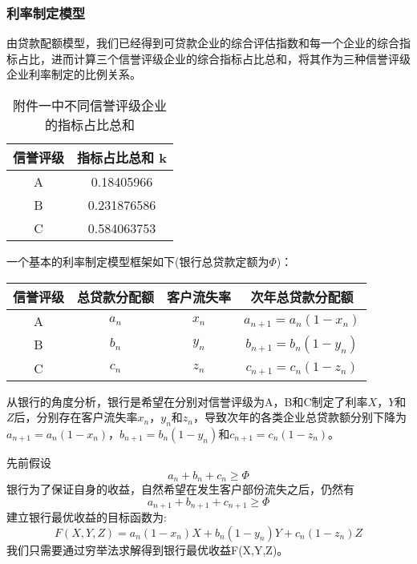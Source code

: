 \documentclass{cumcmthesis}
\begin{document}
\subsubsection{利率制定模型}
由贷款配额模型，我们已经得到可贷款企业的综合评估指数和每一个企业的综合指标占比，进而计算三个信誉评级企业的综合指标占比总和，将其作为三种信誉评级企业利率制定的比例关系。
\begin{table}[H]   %
	\caption{附件一中不同信誉评级企业的指标占比总和}\label{tab:21} \centering
	\begin{tabular}{cc}
		\toprule[1.5pt]
		信誉评级 & 指标占比总和 k\\
		\midrule[1pt]
A & 0.18405966 \\ 
B & 0.231876586 \\ 
C & 0.584063753 \\ 
		\bottomrule[1.5pt]
\end{tabular}
\end{table}
一个基本的利率制定模型框架如下(银行总贷款定额为$\Phi$)：
\begin{table}[H]   %
\label{tab:22} \centering
	\begin{tabular}{cccc}
		\textbf{信誉评级} & \textbf{总贷款分配额} & \textbf{客户流失率} & \textbf{次年总贷款分配额}\\
		\midrule[1pt]
		A & $a_n$ & $x_n$ & $a_{n+1}=a_n(1-x_n)$ \\ 
		B & $b_n$ & $y_n$ & $b_{n+1}=b_n(1-y_n)$ \\ 
		C & $c_n$ & $z_n$ & $c_{n+1}=c_n(1-z_n)$ \\ 
	\end{tabular}
\end{table}

从银行的角度分析，银行是希望在分别对信誉评级为A，B和C制定了利率$X$，$Y$和$Z$后，分别存在客户流失率$x_n$，$y_n$和$z_n$，导致次年的各类企业总贷款额分别下降为
$a_{n+1}=a_n(1-x_n)$，$b_{n+1}=b_n(1-y_n)$和$c_{n+1}=c_n(1-z_n)$。

先前假设
\begin{equation}
a_n+b_n+c_n\geq\Phi
\end{equation}
银行为了保证自身的收益，自然希望在发生客户部份流失之后，仍然有
\begin{equation}
a_{n+1}+b_{n+1}+c_{n+1}\geq\Phi
\end{equation}
建立银行最优收益的目标函数为:
\begin{equation}
F(X,Y,Z)=a_n(1-x_n)X+b_n(1-y_n)Y+c_n(1-z_n)Z
\end{equation}
我们只需要通过穷举法求解得到银行最优收益F(X,Y,Z)。
\end{document}
